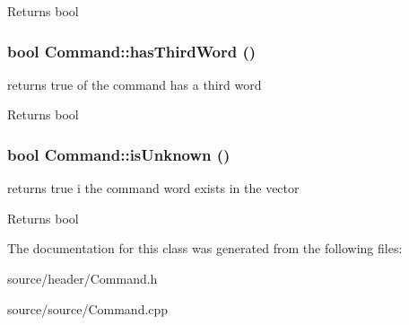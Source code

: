 \begin{DoxyReturn}{Returns}
bool 
\end{DoxyReturn}
\hypertarget{classCommand_a6c94c33f7e5fae0a4ce604bf998603e6}{
\subsubsection[{hasThirdWord}]{\setlength{\rightskip}{0pt plus 5cm}bool Command::hasThirdWord ()}}
\label{d9/d71/classCommand_a6c94c33f7e5fae0a4ce604bf998603e6}
returns true of the command has a third word

\begin{DoxyReturn}{Returns}
bool 
\end{DoxyReturn}
\hypertarget{classCommand_a15fba440e0eb3df75bea367448f52a1a}{
\subsubsection[{isUnknown}]{\setlength{\rightskip}{0pt plus 5cm}bool Command::isUnknown ()}}
\label{d9/d71/classCommand_a15fba440e0eb3df75bea367448f52a1a}
returns true i the command word exists in the vector

\begin{DoxyReturn}{Returns}
bool 
\end{DoxyReturn}


The documentation for this class was generated from the following files:\begin{DoxyCompactItemize}
\item 
source/header/Command.h\item 
source/source/Command.cpp\end{DoxyCompactItemize}
